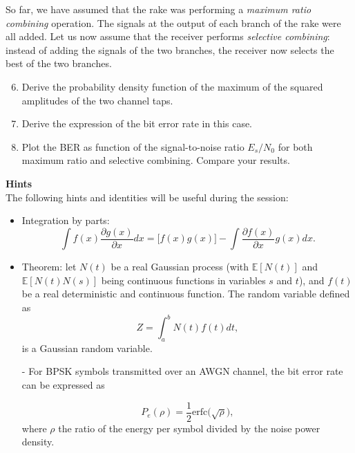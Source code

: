 \documentclass [a4paper, 11pt] {article}
\begin{document}
\begin{exercise}{1}
So far, we have assumed that the rake was performing a \textit{maximum ratio combining} operation. The signals at the output of each branch of the rake were all added. Let us now assume that the receiver performs \textit{selective combining}: instead of adding the signals of the two branches, the receiver now selects the best of the two branches.

\begin{enumerate}
    \setcounter{enumi}{5}
    \item Derive the probability density function of the maximum of the squared amplitudes of the two channel taps.
    \item Derive the expression of the bit error rate in this case.
    \item Plot the BER as function of the signal-to-noise ratio $E_s/N_0$ for both maximum ratio and selective combining. Compare your results.
\end{enumerate}

\newpage

 

\textbf{Hints}\\

The following hints and identities will be useful during the session: 

\begin{itemize}

    \item Integration by parts: 
    \begin{equation}\int f(x)\frac{\partial g(x)}{\partial x} dx = \big[f(x)g(x)\big] - \int \frac{\partial f(x)}{\partial x}g(x)dx. \end{equation}
    \item Theorem: let $N(t)$ be a real Gaussian process (with $\mathbb{E}[N(t)]$ and $\mathbb{E}[N(t)N(s)]$ being continuous functions in variables $s$ and $t$), and $f(t)$ be a real deterministic and continuous function. The random variable defined as
	\begin{equation}
	Z = \int_a^b N(t)f(t)dt,
	\end{equation}
	is a Gaussian random variable.
    \item[-] For BPSK symbols transmitted over an AWGN channel, the bit error rate can be expressed as 
    
    \begin{equation}
        P_e(\rho) = \frac{1}{2}\text{erfc}\big(\sqrt{\rho}\big),
    \end{equation}
    where $\rho$ the ratio of the energy per symbol divided by the noise power density.
    

\end{itemize}
\end{exercise}
\end{document}
